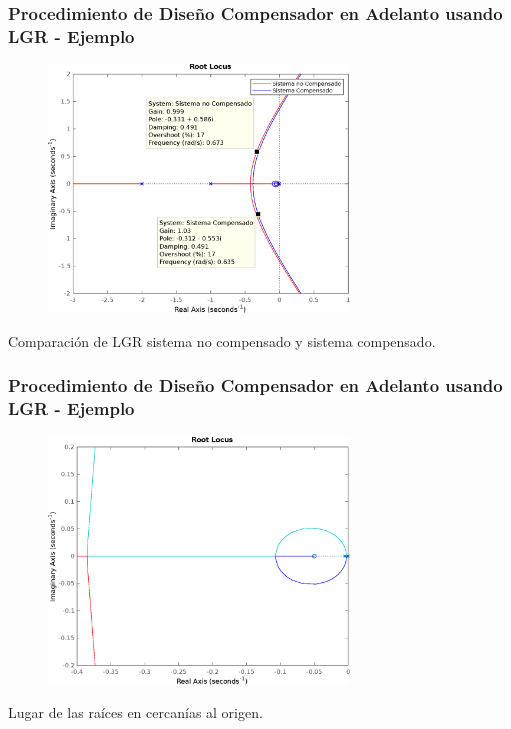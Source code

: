\documentclass[aspectratio=169,handout]{beamer}
\theoremstyle{definition}
\theoremstyle{plain}
\theoremstyle{remark}
\begin{document}
\begin{frame}[c]\frametitle{Procedimiento de Diseño Compensador en Adelanto usando LGR - Ejemplo}
	\begin{figure}
		\centering
		\includegraphics[width=8cm]{images/ejemplo2_LGRcompensado.eps}
	\end{figure}
	\vspace*{-5mm}
	\centering \small Comparación de LGR sistema no compensado y sistema compensado.
\end{frame}

\begin{frame}[c]\frametitle{Procedimiento de Diseño Compensador en Adelanto usando LGR - Ejemplo}
	\begin{figure}
		\centering
		\includegraphics[width=8cm]{images/ejemplo2_LGR_origen.eps}
	\end{figure}
	\vspace*{-5mm}
	\centering \small Lugar de las raíces en cercanías al origen.
\end{frame}
\end{document}
